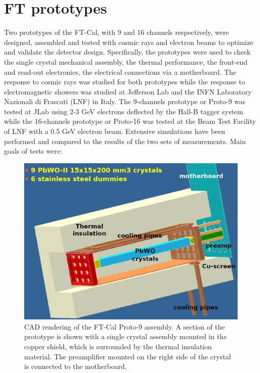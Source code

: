 \section{FT prototypes}
Two prototypes of the FT-Cal, with 9 and 16 channels respectively, were designed, assembled and tested with cosmic rays and electron beams to optimize and validate the detector design. Specifically, the prototypes were used to check 
the single crystal mechanical assembly, the thermal performance, the front-end and read-out electronics, 
the electrical connections via a motherboard.
The response to cosmic rays was studied for both prototypes while the response to electromagnetic showers was studied at Jefferson Lab and the INFN Laboratory Nazionali di Frascati (LNF) in Italy.
The 9-channels prototype or Proto-9 was tested at JLab using 2-3 GeV electrons deflected by the Hall-B tagger system  while the 16-channels prototype or Proto-16 was tested at the Beam Test Facility of LNF with a 0.5 GeV electron beam.  Extensive simulations have been performed and compared to the results of the two sets of measurements. 
Main goals of  tests were:

\begin{figure}
\includegraphics[width=1.0\columnwidth]{./fig/p9-whole.eps}
\caption{CAD rendering of the FT-Cal Proto-9 assembly. A section of the prototype is shown with a single crystal assembly mounted in the copper shield, which is surrounded by the thermal insulation material. The preamplifier mounted on the right side of the crystal is connected to the motherboard.}
\label{fig:p9-whole}
\end{figure}

